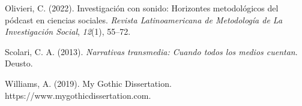\documentclass[
]{interact}
\newlength{\cslhangindent}
\newenvironment{CSLReferences}[2] %
 {\begin{list}{}{%
  \setlength{\itemindent}{0pt}
  \setlength{\leftmargin}{0pt}
  \setlength{\parsep}{0pt}
  \ifodd #1
   \setlength{\leftmargin}{\cslhangindent}
   \setlength{\itemindent}{-1\cslhangindent}
  \fi
  \setlength{\itemsep}{#2\baselineskip}}}
 {\end{list}}
\begin{document}
\begin{CSLReferences}{1}{0}
Olivieri, C. (2022). Investigaci{ó}n con sonido: {Horizontes}
metodol{ó}gicos del p{ó}dcast en ciencias sociales. \emph{Revista
Latinoamericana de Metodolog{í}a de La Investigaci{ó}n Social},
\emph{12}(1), 55--72.

Scolari, C. A. (2013). \emph{Narrativas transmedia: {Cuando} todos los
medios cuentan}. Deusto.

Williams, A. (2019). My {Gothic Dissertation}.
https://www.mygothicdissertation.com.

\end{CSLReferences}
\end{document}
